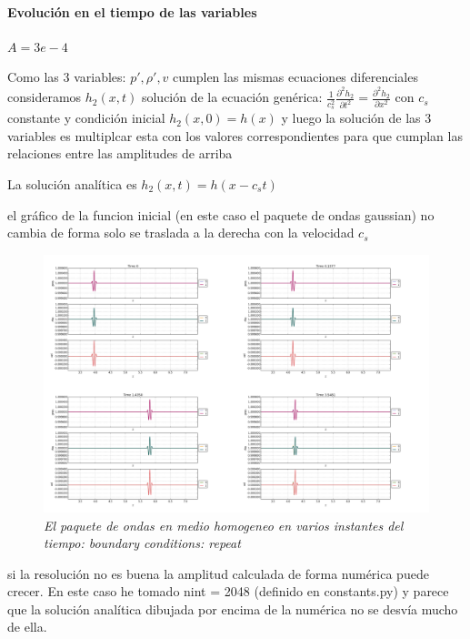 \documentclass{article}
\begin{document}
\paragraph{Evolución en el tiempo de las variables}
\begin{description}
\item $A = 3e-4$
\item Como las 3 variables: $p\prime, \rho\prime, v$  cumplen las mismas ecuaciones diferenciales consideramos $h_2(x,t)$ solución de la ecuación genérica:   
 $\frac{1}{c_s^{2}} \frac{\partial^{2} h_2}{\partial t^{2}} = \frac{ \partial^{2} h_2}{\partial x^2}   $ con $c_s$ constante  y condición inicial $h_2(x,0) = h(x)$
y luego la solución de las 3 variables es multiplcar esta con los valores correspondientes para que cumplan las relaciones entre las amplitudes de arriba

\item La solución analítica  es
$h_2(x,t) = h(x - c_s t)$
\item el gráfico de la  funcion inicial (en este caso el paquete de ondas gaussian) no cambia de forma solo se traslada a la derecha con la velocidad $c_s$

\begin{figure}[!ht]
 \centering
 \includegraphics[scale=0.2]{mainhom.png}
 \caption{\emph{El paquete de ondas en medio homogeneo en varios instantes del tiempo: boundary conditions: repeat}}
\end{figure}

\item si la resolución no es buena la amplitud calculada de forma numérica puede crecer. En este caso he tomado nint = 2048 (definido en constants.py)
y parece que la solución analítica dibujada por encima de la numérica no se desvía mucho de ella.
\end{description}
\end{document}
